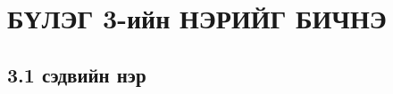 \chapter{БҮЛЭГ 3-ийн НЭРИЙГ БИЧНЭ} %
\label{Chapter3} %
\pagecolor{white}

\section{3.1 сэдвийн нэр}